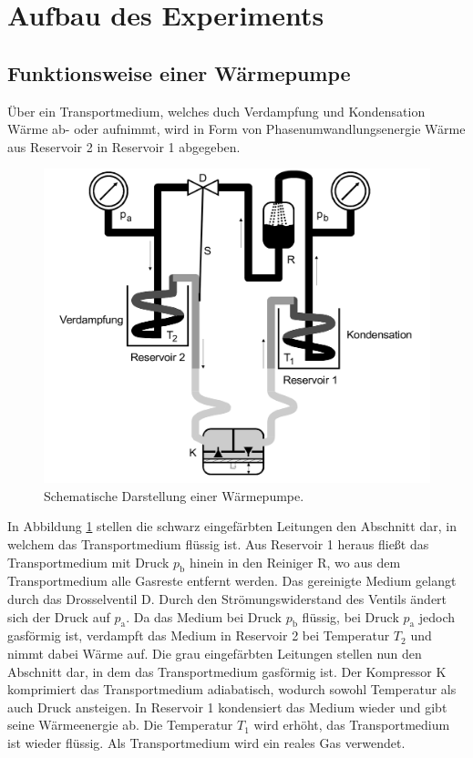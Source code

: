 \documentclass{scrartcl} %
\begin{document}
\section{Aufbau des Experiments}
    \subsection{Funktionsweise einer Wärmepumpe}
      Über ein Transportmedium, welches duch Verdampfung und Kondensation Wärme ab- oder aufnimmt,
      wird in Form von Phasenumwandlungsenergie Wärme aus Reservoir 2 in Reservoir 1 abgegeben.
      \begin{figure}
        \centering
        \includegraphics[scale = 0.15]{AufbauWaermepumpe.png}
        \caption{Schematische Darstellung einer Wärmepumpe.}
        \label{fig:wärmepumpe1}
      \end{figure}
      In Abbildung \ref{fig:wärmepumpe1} stellen die schwarz eingefärbten Leitungen den Abschnitt dar, in welchem das Transportmedium flüssig ist.
      Aus Reservoir 1 heraus fließt das Transportmedium mit Druck $p_\text{b}$ hinein in den Reiniger R, wo aus dem Transportmedium alle Gasreste entfernt werden.
      Das gereinigte Medium gelangt durch das Drosselventil D. Durch den Strömungswiderstand des Ventils ändert sich der Druck auf $p_\text{a}$. Da das Medium bei Druck $p_\text{b}$
      flüssig, bei Druck $p_\text{a}$ jedoch gasförmig ist, verdampft das Medium in Reservoir 2 bei Temperatur $T_\text{2}$ und nimmt dabei Wärme auf. Die grau eingefärbten Leitungen
      stellen nun den Abschnitt dar, in dem das Transportmedium gasförmig ist. Der Kompressor K komprimiert das Transportmedium adiabatisch,
      wodurch sowohl Temperatur als auch Druck ansteigen.
      In Reservoir 1 kondensiert das Medium wieder und gibt seine Wärmeenergie ab. Die Temperatur $T_\text{1}$ wird erhöht, das
      Transportmedium ist wieder flüssig. Als Transportmedium wird ein reales Gas verwendet.
\end{document}
